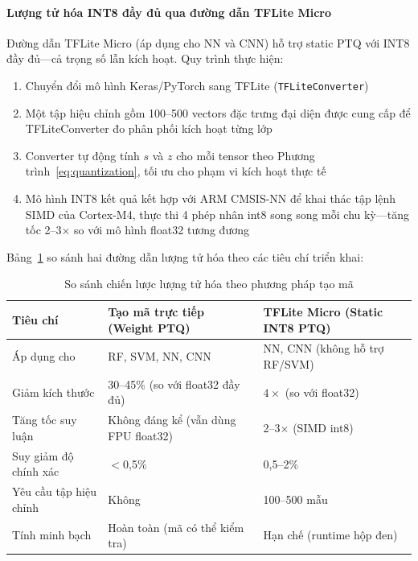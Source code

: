 \paragraph{Lượng tử hóa INT8 đầy đủ qua đường dẫn TFLite Micro}
Đường dẫn TFLite Micro (áp dụng cho NN và CNN) hỗ trợ static PTQ với INT8 đầy đủ---cả trọng số lẫn kích hoạt. Quy trình thực hiện:
\begin{enumerate}
    \item Chuyển đổi mô hình Keras/PyTorch sang TFLite (\texttt{TFLiteConverter})
    \item Một tập hiệu chỉnh gồm 100--500 vectors đặc trưng đại diện được cung cấp để TFLiteConverter đo phân phối kích hoạt từng lớp
    \item Converter tự động tính $s$ và $z$ cho mỗi tensor theo Phương trình~\ref{eq:quantization}, tối ưu cho phạm vi kích hoạt thực tế
    \item Mô hình INT8 kết quả kết hợp với ARM CMSIS-NN \cite{banbury2021mlperf} để khai thác tập lệnh SIMD của Cortex-M4, thực thi 4 phép nhân int8 song song mỗi chu kỳ---tăng tốc 2--3$\times$ so với mô hình float32 tương đương
\end{enumerate}

Bảng~\ref{tab:quantization_tradeoff} so sánh hai đường dẫn lượng tử hóa theo các tiêu chí triển khai:

\begin{table}[H]
    \centering
    \caption{So sánh chiến lược lượng tử hóa theo phương pháp tạo mã}
    \label{tab:quantization_tradeoff}
    \small
    \begin{tabular}{@{}p{3.5cm}p{3.5cm}p{4.2cm}@{}}
        \toprule
        Tiêu chí & Tạo mã trực tiếp (Weight PTQ) & TFLite Micro (Static INT8 PTQ) \\
        \midrule
        Áp dụng cho & RF, SVM, NN, CNN & NN, CNN (không hỗ trợ RF/SVM) \\
        Giảm kích thước & 30--45\% (so với float32 đầy đủ) & $4\times$ (so với float32) \\
        Tăng tốc suy luận & Không đáng kể (vẫn dùng FPU float32) & 2--3$\times$ (SIMD int8) \\
        Suy giảm độ chính xác & $<$0,5\% & 0,5--2\% \\
        Yêu cầu tập hiệu chỉnh & Không & 100--500 mẫu \\
        Tính minh bạch & Hoàn toàn (mã có thể kiểm tra) & Hạn chế (runtime hộp đen) \\
        \bottomrule
    \end{tabular}
\end{table}

